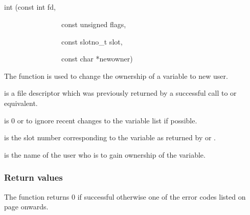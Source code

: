 \subsection{\funcnameXBvarchown{}}

\begin{expara}

int \funcnameXBvarchown{}(const int fd,

\ \ \ \ \ \ \ \ \ \ \ \ \ \ \ \ const unsigned flags,

\ \ \ \ \ \ \ \ \ \ \ \ \ \ \ \ const slotno\_t slot,

\ \ \ \ \ \ \ \ \ \ \ \ \ \ \ \ const char *newowner)

\end{expara}

The function \funcXBvarchown{} is used to change the
ownership of a variable to new user.

 is a file descriptor which was previously
returned by a successful call to \funcXBopen{} or equivalent.

 is 0 or
 to ignore recent changes to
the variable list if possible.

 is the slot number corresponding to the
variable as returned by \funcXBvarlist{} or
\funcXBvarfindslot{}.

 is the name of the user who is to gain
ownership of the variable.

\subsubsection{Return values}
The function returns 0 if successful otherwise one of the error codes
listed on page \pageref{errorcodes} onwards.

